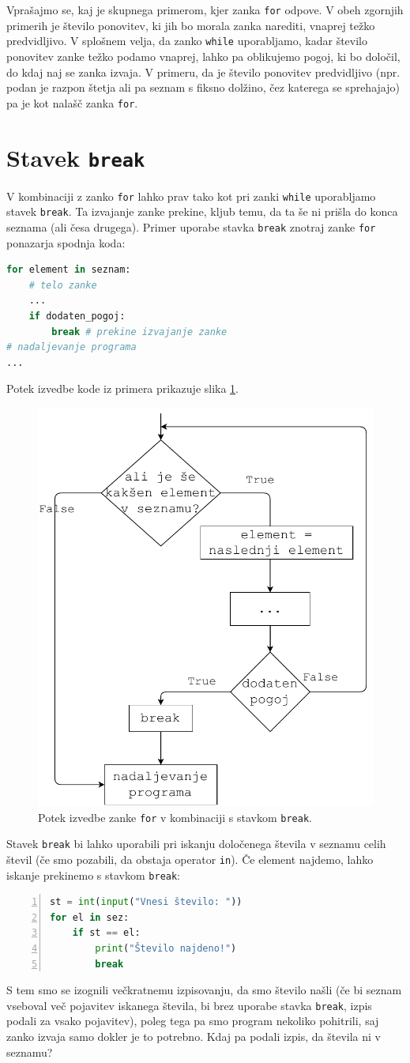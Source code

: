 Vprašajmo se, kaj je skupnega primerom, kjer zanka \texttt{for} odpove. V obeh zgornjih primerih je število ponovitev, ki jih bo morala zanka narediti, vnaprej težko predvidljivo. V splošnem velja, da zanko \texttt{while} uporabljamo, kadar število ponovitev zanke težko podamo vnaprej, lahko pa oblikujemo pogoj, ki bo določil, do kdaj naj se zanka izvaja. V primeru, da je število ponovitev predvidljivo (npr. podan je razpon štetja ali pa seznam s fiksno dolžino, čez katerega se sprehajajo) pa je kot nalašč zanka \texttt{for}.

\section{Stavek \texttt{break}}

V kombinaciji z zanko \texttt{for} lahko prav tako kot pri zanki \texttt{while} uporabljamo stavek \texttt{break}. Ta izvajanje zanke prekine, kljub temu, da ta še ni prišla do konca seznama (ali česa drugega). Primer uporabe stavka \texttt{break} znotraj zanke \texttt{for} ponazarja spodnja koda:
\begin{lstlisting}[language=Python]
for element in seznam:
    # telo zanke
    ...
    if dodaten_pogoj: 
        break # prekine izvajanje zanke
# nadaljevanje programa
...
\end{lstlisting}
Potek izvedbe kode iz primera prikazuje slika \ref{img:for2}.
\begin{figure}
    \centering
    \includegraphics[width=0.5\linewidth]{img/for2.pdf}
    \caption{Potek izvedbe zanke \texttt{for} v kombinaciji s stavkom \texttt{break}.}
    \label{img:for2}
\end{figure}

Stavek \texttt{break} bi lahko uporabili pri iskanju določenega števila v seznamu celih števil (če smo pozabili, da obstaja operator \texttt{in}). Če element najdemo, lahko iskanje prekinemo s stavkom \texttt{break}:
\begin{lstlisting}[language=Python,numbers=left]
st = int(input("Vnesi število: "))
for el in sez:
    if st == el:
        print("Število najdeno!")
        break
\end{lstlisting}
S tem smo se izognili večkratnemu izpisovanju, da smo število našli (če bi seznam vseboval več pojavitev iskanega števila, bi brez uporabe stavka \texttt{break}, izpis podali za vsako pojavitev), poleg tega pa smo program nekoliko pohitrili, saj zanko izvaja samo dokler je to potrebno. Kdaj pa podali izpis, da števila ni v seznamu? 

